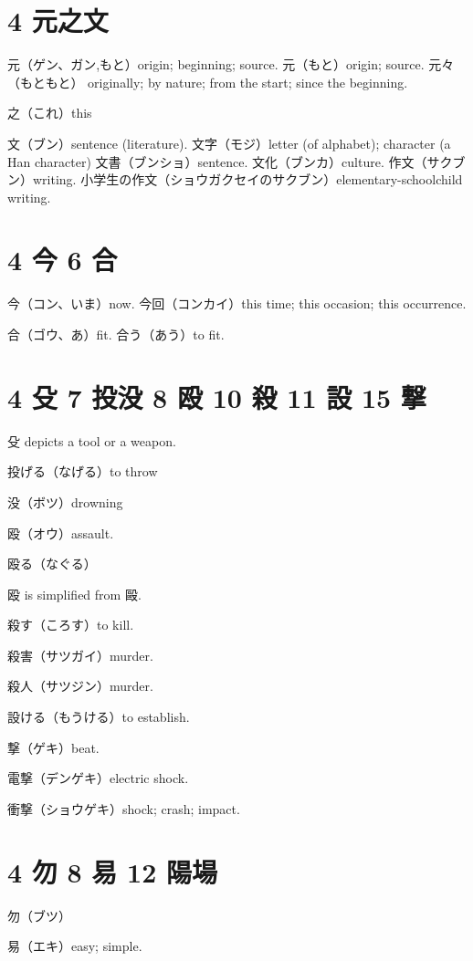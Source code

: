 \section{4 元之文}

元（ゲン、ガン,もと）origin; beginning; source.
元（もと）origin; source.
元々（もともと）
originally; by nature; from the start; since the beginning.

之（これ）this

文（ブン）sentence (literature).
文字（モジ）letter (of alphabet); character (a Han character)
文書（ブンショ）sentence.
文化（ブンカ）culture.
作文（サクブン）writing.
小学生の作文（ショウガクセイのサクブン）elementary-schoolchild writing.

\section{4 今 6 合}

今（コン、いま）now.
今回（コンカイ）this time; this occasion; this occurrence.

合（ゴウ、あ）fit.
合う（あう）to fit.

\section{4 殳 7 投没 8 殴 10 殺 11 設 15 撃}

殳 depicts a tool or a weapon.

投げる（なげる）to throw

没（ボツ）drowning

殴（オウ）assault.

殴る（なぐる）

殴 is simplified from 毆.

殺す（ころす）to kill.

殺害（サツガイ）murder.

殺人（サツジン）murder.

設ける（もうける）to establish.

撃（ゲキ）beat.

電撃（デンゲキ）electric shock.

衝撃（ショウゲキ）shock; crash; impact.

\section{4 勿 8 易 12 陽場}

勿（ブツ）

易（エキ）easy; simple.

